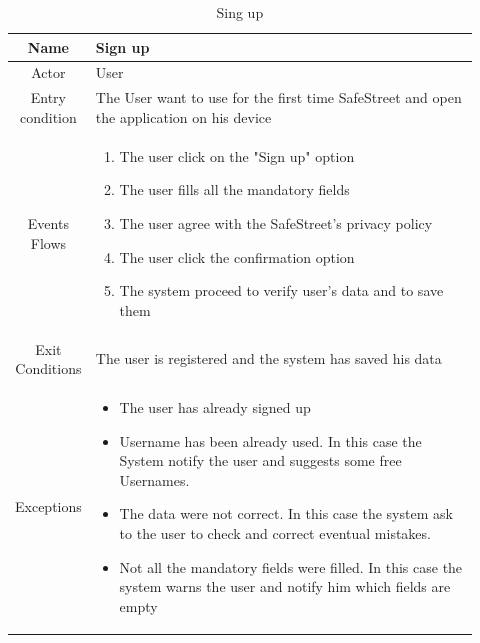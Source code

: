\documentclass[12pt,a4paper]{report}
\begin{document}
				\begin{table}[H]
					\centering
					\begin{tabular}{|c|p{0.92\linewidth}|}
						\hline
						Name & {Sign up} \\
						\hline
						Actor & {User} \\
						\hline
						Entry condition & {The User want to use for the first time SafeStreet and open the application on
									his device} \\
						\hline
						Events Flows &{ 
								\vskip 4pt
								\begin{enumerate}
									\item The user click on the "Sign up" option
									\item The user fills all the mandatory fields
									\item The user agree with the SafeStreet's privacy policy
									\item The user click the confirmation option
									\item The system proceed to verify user's data and to save them
								\end{enumerate}
								\vskip 4pt}\\
						\hline
						Exit Conditions & {The user is registered and the system has saved his data} \\
						\hline
						Exceptions & {
								\vskip 4pt
								\begin{itemize}
									\item The user has already signed up
									\item Username has been already used. In this case the System notify the user and
										suggests some free Usernames.
									\item The data were not correct. In this case the system ask to the user to check and
										correct eventual mistakes.
									\item Not all the mandatory fields were filled. In this case the system warns the user
										and notify him which fields are empty
								\end{itemize}
								\vskip 4pt
						} \\
						\hline
					\end{tabular}
					\caption{Sing up}
					\label{tab: }
				\end{table}
\end{document}
